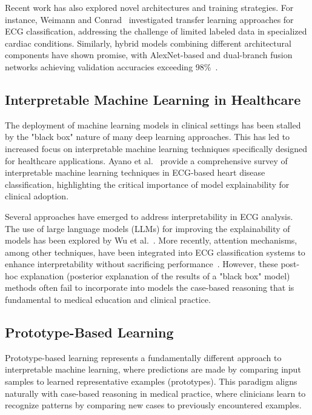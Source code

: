 Recent work has also explored novel architectures and training strategies. For instance, Weimann and Conrad~\cite{weimann2021transfer} investigated transfer learning approaches for ECG classification, addressing the challenge of limited labeled data in specialized cardiac conditions. Similarly, hybrid models combining different architectural components have shown promise, with AlexNet-based and dual-branch fusion networks achieving validation accuracies exceeding 98\%~\cite{kolhar2024deep}.

\subsection{Interpretable Machine Learning in Healthcare}

The deployment of machine learning models in clinical settings has been stalled by the "black box" nature of many deep learning approaches. This has led to increased focus on interpretable machine learning techniques specifically designed for healthcare applications. Ayano et al.~\cite{ayano2021survey} provide a comprehensive survey of interpretable machine learning techniques in ECG-based heart disease classification, highlighting the critical importance of model explainability for clinical adoption.

Several approaches have emerged to address interpretability in ECG analysis. The use of large language models (LLMs) for improving the explainability of models has been explored by Wu et al.~\cite{wu2025explainability}. More recently, attention mechanisms, among other techniques, have been integrated into ECG classification systems to enhance interpretability without sacrificing performance~\cite{sharma2022interpretable}. However, these post-hoc explanation (posterior explanation of the results of a "black box" model) methods often fail to incorporate into models the case-based reasoning that is fundamental to medical education and clinical practice.

\subsection{Prototype-Based Learning}

Prototype-based learning represents a fundamentally different approach to interpretable machine learning, where predictions are made by comparing input samples to learned representative examples (prototypes). This paradigm aligns naturally with case-based reasoning in medical practice, where clinicians learn to recognize patterns by comparing new cases to previously encountered examples.

